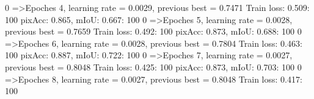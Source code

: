   0%
=>Epoches 4, learning rate = 0.0029,                 previous best = 0.7471
Train loss: 0.509: 100%
pixAcc: 0.865, mIoU: 0.667: 100%
  0%
=>Epoches 5, learning rate = 0.0028,                 previous best = 0.7659
Train loss: 0.492: 100%
pixAcc: 0.873, mIoU: 0.688: 100%
  0%
=>Epoches 6, learning rate = 0.0028,                 previous best = 0.7804
Train loss: 0.463: 100%
pixAcc: 0.887, mIoU: 0.722: 100%
  0%
=>Epoches 7, learning rate = 0.0027,                 previous best = 0.8048
Train loss: 0.425: 100%
pixAcc: 0.873, mIoU: 0.703: 100%
  0%
=>Epoches 8, learning rate = 0.0027,                 previous best = 0.8048
Train loss: 0.417: 100%

